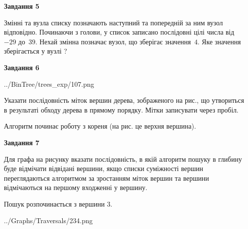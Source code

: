 \documentclass[12pt, ukrainian]{article}
\begin{document}
{\begin {large}
{\begin {center}\textbf{Завдання 5}\end {center}}\par
Змінні  та  вузла списку позначають наступний та попередній за ним вузол відповідно. Починаючи з голови, у список записано послідовні цілі числа від~$-29$ до~$39$. Нехай змінна  позначає вузол, що зберігає значення~$4$.
Яке значення зберігається у вузлі  ?\par
\newpage

{\begin {center}\textbf{Завдання 6}\end {center}}\par

\begin{center}
	{../BinTree/trees_exp/107.png}
\end{center}
Указати послідовність міток вершин дерева, зображеного на рис., що утвориться в результаті обходу дерева в прямому порядку. Мітки записувати через пробіл.\par Алгоритм починає роботу з кореня (на рис. це верхня вершина).\par
\newpage

{\begin {center}\textbf{Завдання 7}\end {center}}\par
Для графа на рисунку вказати послідовність, в якій алгоритм пошуку в глибину буде відмічати відвідані вершини, якщо списки суміжності вершин переглядаються алгоритмом за зростанням міток вершин та вершини відмічаються на першому вход\-женні у вершину.\par
Пошук розпочинається з вершини 3.\par

\begin{center}
	{../Graphs/Traversals/234.png}
\end{center}\par
\newpage


\end{large}}
\end{document}
